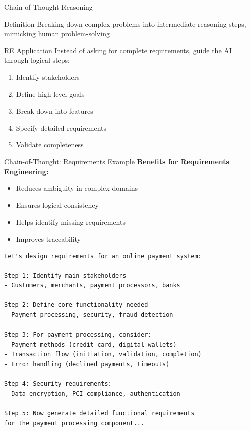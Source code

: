 \documentclass{beamer}
\begin{document}
\begin{frame}{Chain-of-Thought Reasoning}
    \begin{block}{Definition}
        Breaking down complex problems into intermediate reasoning steps, mimicking human problem-solving
    \end{block}
    
    \begin{exampleblock}{RE Application}
        Instead of asking for complete requirements, guide the AI through logical steps:
        \scriptsize
        \begin{enumerate}
            \item Identify stakeholders
            \item Define high-level goals
            \item Break down into features
            \item Specify detailed requirements
            \item Validate completeness
        \end{enumerate}
    \end{exampleblock}
    
\end{frame}

\begin{frame}[t, fragile]{Chain-of-Thought: Requirements Example}
    \textbf{Benefits for Requirements Engineering:}
    \scriptsize
    \begin{itemize}
        \item Reduces ambiguity in complex domains
        \item Ensures logical consistency
        \item Helps identify missing requirements
        \item Improves traceability
    \end{itemize}
    \begin{lstlisting}[style=code, caption={Chain-of-Thought for Payment System}]
Let's design requirements for an online payment system:

Step 1: Identify main stakeholders
- Customers, merchants, payment processors, banks

Step 2: Define core functionality needed
- Payment processing, security, fraud detection

Step 3: For payment processing, consider:
- Payment methods (credit card, digital wallets)
- Transaction flow (initiation, validation, completion)
- Error handling (declined payments, timeouts)

Step 4: Security requirements:
- Data encryption, PCI compliance, authentication

Step 5: Now generate detailed functional requirements 
for the payment processing component...
    \end{lstlisting}
\end{frame}
\end{document}
